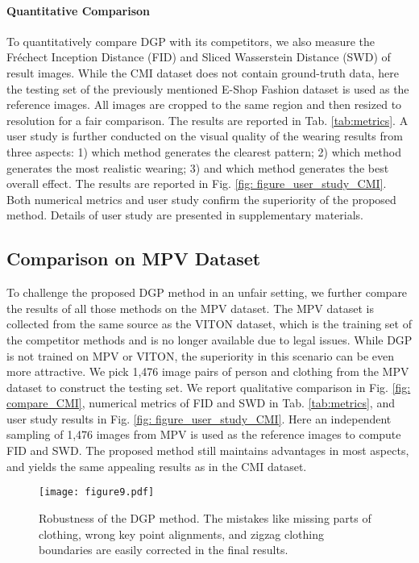 \documentclass[10pt,twocolumn,letterpaper]{article}
\begin{document}
\paragraph{Quantitative Comparison} To quantitatively compare DGP with its competitors, we also measure the Fr\'echect Inception Distance (FID) \cite{heusel2017gans} and Sliced Wasserstein Distance (SWD) \cite{deshpande2018generative,kolouri2018sliced,kolouri2019generalized} of result images. While the CMI dataset does not contain ground-truth data, here the testing set of the previously mentioned E-Shop Fashion dataset is used as the reference images. All images are cropped to the same region and then resized to  resolution for a fair comparison. The results are reported in Tab. \ref{tab:metrics}. A user study is further conducted on the visual quality of the wearing results from three aspects: 1) which method generates the clearest pattern; 2) which method generates the most realistic wearing; 3) and which method generates the best overall effect. The results are reported in Fig. \ref{fig: figure_user_study_CMI}. Both numerical metrics and user study confirm the superiority of the proposed method. Details of user study are presented in supplementary materials.


\subsection{Comparison on MPV Dataset}\label{sec:MPV}
To challenge the proposed DGP method in an unfair setting, we further compare the results of all those methods on the MPV dataset. The MPV dataset is collected from the same source as the VITON dataset, which is the training set of the competitor methods and is no longer available due to legal issues. While DGP is not trained on MPV or VITON, the superiority in this scenario can be even more attractive. We pick 1,476 image pairs of person and clothing from the MPV dataset to construct the testing set. We report qualitative comparison in Fig. \ref{fig: compare_CMI}, numerical metrics of FID and SWD in Tab. \ref{tab:metrics}, and user study results in Fig. \ref{fig: figure_user_study_CMI}. Here an independent sampling of 1,476 images from MPV is used as the reference images to compute FID and SWD. The proposed method still maintains advantages in most aspects, and yields the same appealing results as in the CMI dataset.

\begin{figure}[h]
  \centering
  \texttt{[image: figure9.pdf]}\caption{Robustness of the DGP method. The mistakes like missing parts of clothing, wrong key point alignments, and zigzag clothing boundaries are easily corrected in the final results.}\label{fig: figure_robust}\end{figure}
\end{document}
